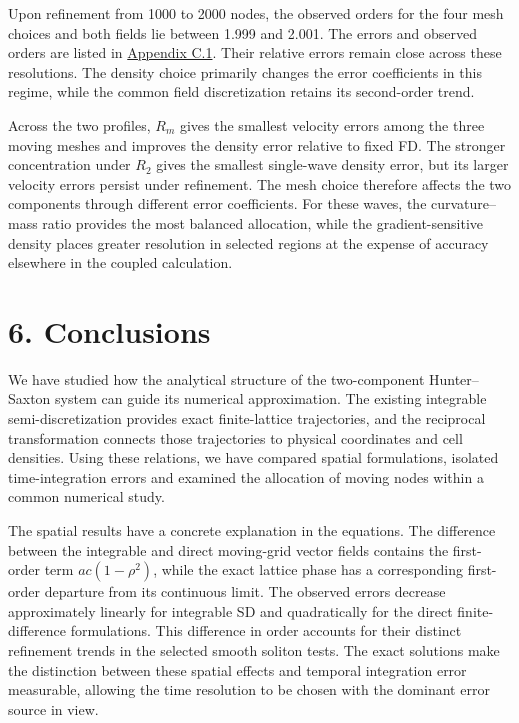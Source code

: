 \documentclass[11pt,a4paper]{article}
\begin{document}
Upon refinement from 1000 to 2000 nodes, the observed orders for the four mesh choices and both fields lie between 1.999 and 2.001. The errors and observed orders are listed in \hyperref[app:refinement]{Appendix C.1}. Their relative errors remain close across these resolutions. The density choice primarily changes the error coefficients in this regime, while the common field discretization retains its second-order trend.

Across the two profiles, \(R_m\) gives the smallest velocity errors among the three moving meshes and improves the density error relative to fixed FD. The stronger concentration under \(R_2\) gives the smallest single-wave density error, but its larger velocity errors persist under refinement. The mesh choice therefore affects the two components through different error coefficients. For these waves, the curvature--mass ratio provides the most balanced allocation, while the gradient-sensitive density places greater resolution in selected regions at the expense of accuracy elsewhere in the coupled calculation.

\FloatBarrier
\section*{6. Conclusions}

We have studied how the analytical structure of the two-component Hunter–Saxton system can guide its numerical approximation. The existing integrable semi-discretization provides exact finite-lattice trajectories, and the reciprocal transformation connects those trajectories to physical coordinates and cell densities. Using these relations, we have compared spatial formulations, isolated time-integration errors and examined the allocation of moving nodes within a common numerical study.

The spatial results have a concrete explanation in the equations. The difference between the integrable and direct moving-grid vector fields contains the first-order term \(ac(1-\rho^2)\), while the exact lattice phase has a corresponding first-order departure from its continuous limit. The observed errors decrease approximately linearly for integrable SD and quadratically for the direct finite-difference formulations. This difference in order accounts for their distinct refinement trends in the selected smooth soliton tests. The exact solutions make the distinction between these spatial effects and temporal integration error measurable, allowing the time resolution to be chosen with the dominant error source in view.
\end{document}
